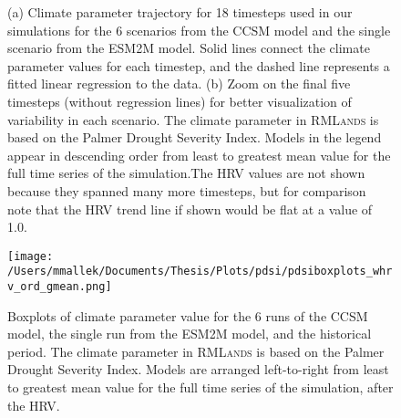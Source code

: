 \documentclass[12pt]{article}
\begin{document}
\begin{spacing}{1}
\begin{figure}[!htbp]
\centering
	\caption{(a) Climate parameter trajectory for 18 timesteps used in our simulations for the 6 scenarios from the CCSM model and the single scenario from the ESM2M model. Solid lines connect the climate parameter values for each timestep, and the dashed line represents a fitted linear regression to the data. (b) Zoom on the final five timesteps (without regression lines) for better visualization of variability in each scenario. The climate parameter in \textsc{RMLands} is based on the Palmer Drought Severity Index. Models in the legend appear in descending order from least to greatest mean value for the full time series of the simulation.The HRV values are not shown because they spanned many more timesteps, but for comparison note that the HRV trend line if shown would be flat at a value of 1.0.}
\label{fig:pdsi_future}

\end{figure}



\begin{figure}[!htbp]
\centering
\texttt{[image: /Users/mmallek/Documents/Thesis/Plots/pdsi/pdsiboxplots\_whrv\_ord\_gmean.png]}
\caption{Boxplots of climate parameter value for the 6 runs of the CCSM model, the single run from the ESM2M model, and the historical period.  The climate parameter in \textsc{RMLands} is based on the Palmer Drought Severity Index. Models are arranged left-to-right from least to greatest mean value for the full time series of the simulation, after the HRV.}
\label{pdsi-boxplots}
\end{figure}



\end{spacing}
\end{document}
